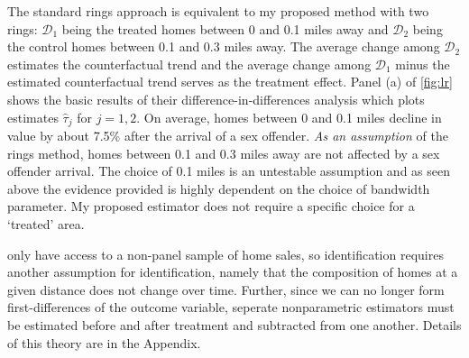 The standard rings approach is equivalent to my proposed method with two rings: $\mathcal{D}_1$ being the treated homes between 0 and 0.1 miles away and $\mathcal{D}_2$ being the control homes between 0.1 and 0.3 miles away. The average change among $\mathcal{D}_2$ estimates the counterfactual trend and the average change among $\mathcal{D}_1$ minus the estimated counterfactual trend serves as the treatment effect. Panel (a) of \autoref{fig:lr} shows the basic results of their difference-in-differences analysis which plots estimates $\hat{\tau}_j$ for $j = 1,2$.  On average, homes between 0 and 0.1 miles decline in value by about 7.5\% after the arrival of a sex offender. \textit{As an assumption} of the rings method, homes between 0.1 and 0.3 miles away are not affected by a sex offender arrival. The choice of 0.1 miles is an untestable assumption and as seen above the evidence provided is highly dependent on the choice of bandwidth parameter. My proposed estimator does not require a specific choice for a `treated' area.

\citet{Linden_Rockoff_2008} only have access to a non-panel sample of home sales, so identification requires another assumption for identification, namely that the composition of homes at a given distance does not change over time. Further, since we can no longer form first-differences of the outcome variable, seperate nonparametric estimators must be estimated before and after treatment and subtracted from one another. Details of this theory are in the Appendix.

